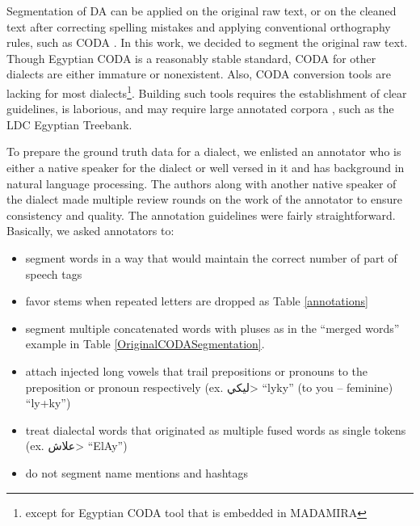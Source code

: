 \documentclass[11pt,letterpaper]{article}
\begin{document}
Segmentation of DA can be applied on the original raw text, or on the cleaned text after correcting spelling mistakes and applying conventional orthography rules, such as CODA \cite{habash2012conventional}.  In this work, we decided to segment the original raw text.   Though Egyptian CODA is a reasonably stable standard, CODA for other dialects are either immature or nonexistent. Also, CODA conversion tools are lacking for most dialects\footnote{except for Egyptian CODA tool that is embedded in MADAMIRA}. Building such tools requires the establishment of clear guidelines, is laborious, and may require large annotated corpora \cite{eskander2013processing}, such as the LDC Egyptian Treebank. 

To prepare the ground truth data for a dialect, we enlisted an annotator who is either a native speaker for the dialect or well versed in it and has background in natural language processing.  The authors along with another native speaker of the dialect made multiple review rounds on the work of the annotator to ensure consistency and quality.  
The annotation guidelines were fairly straightforward. Basically, we asked annotators to:
\begin{itemize}[leftmargin=*]
\setlength\itemsep{-0.3em}
\item segment words in a way that would maintain the correct number of part of speech tags
\item favor stems when repeated letters are dropped as Table \ref{annotations}
\item segment multiple concatenated words with pluses as in the ``merged words'' example in Table \ref{OriginalCODASegmentation}.
\item attach injected long vowels that trail prepositions or pronouns to the preposition or pronoun respectively (ex. \<ليكي> ``lyky'' (to you -- feminine)  ``ly+ky'')
\item treat dialectal words that originated as multiple fused words as single tokens (ex. \<علاش> ``ElA\>y\textquotesingle '')
\item do not segment name mentions and hashtags
\end{itemize}
\end{document}
